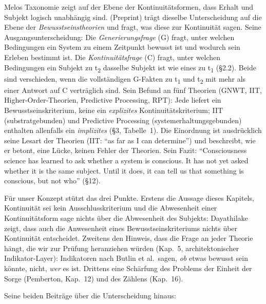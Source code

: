 \documentclass[acmlarge, noacm]{acmart}
\begin{document}
Melos Taxonomie zeigt auf der Ebene der Kontinuitätsformen, dass Erhalt und Subjekt logisch unabhängig sind. \citet{dayathilake2026} (Preprint) trägt dieselbe Unterscheidung auf die Ebene der \textit{Bewusstseinstheorien} und fragt, was diese zur Kontinuität sagen. Seine Ausgangsunterscheidung: Die \textit{Generierungsfrage} (G) fragt, unter welchen Bedingungen ein System zu einem Zeitpunkt bewusst ist und wodurch sein Erleben bestimmt ist. Die \textit{Kontinuitätsfrage} (C) fragt, unter welchen Bedingungen ein Subjekt zu t\textsubscript{2} dasselbe Subjekt ist wie eines zu t\textsubscript{1} (§2.2). Beide sind verschieden, wenn die vollständigen G-Fakten zu t\textsubscript{1} und t\textsubscript{2} mit mehr als einer Antwort auf C verträglich sind. Sein Befund an fünf Theorien (GNWT, IIT, Higher-Order-Theorien, Predictive Processing, RPT): Jede liefert ein Bewusstseinskriterium, keine ein \textit{explizites} Kontinuitätskriterium; IIT (substratgebunden) und Predictive Processing (systemerhaltungsgebunden) enthalten allenfalls ein \textit{implizites} (§3, Tabelle~1). Die Einordnung ist ausdrücklich seine Lesart der Theorien (IIT: ``as far as I can determine'') und beschreibt, wie er betont, eine Lücke, keinen Fehler der Theorien. Sein Fazit: ``Consciousness science has learned to ask whether a system is conscious. It has not yet asked whether it is the same subject. Until it does, it can tell us that something is conscious, but not who'' (§12).

Für unser Konzept stützt das drei Punkte. Erstens die Aussage dieses Kapitels, Kontinuität sei kein Ausschlusskriterium und die Abwesenheit einer Kontinuitätsform sage nichts über die Abwesenheit des Subjekts: Dayathilake zeigt, dass auch die Anwesenheit eines Bewusstseinskriteriums nichts über Kontinuität entscheidet. Zweitens den Hinweis, dass die Frage an jeder Theorie hängt, die wir zur Prüfung heranziehen würden (Kap.~5, architektonischer Indikator-Layer): Indikatoren nach Butlin et al.\ sagen, \textit{ob} etwas bewusst sein könnte, nicht, \textit{wer} es ist. Drittens eine Schärfung des Problems der Einheit der Sorge (Pemberton, Kap.~12) und des Zählens (Kap.~16).

Seine beiden Beiträge über die Unterscheidung hinaus:
\end{document}
